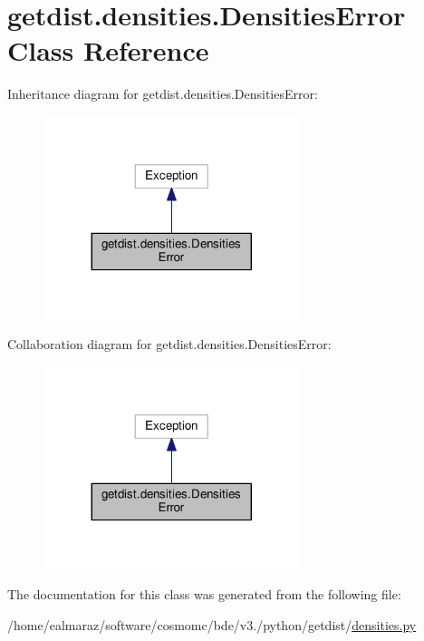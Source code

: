 \hypertarget{classgetdist_1_1densities_1_1DensitiesError}{}\section{getdist.\+densities.\+Densities\+Error Class Reference}
\label{classgetdist_1_1densities_1_1DensitiesError}


Inheritance diagram for getdist.\+densities.\+Densities\+Error\+:
\nopagebreak
\begin{figure}[H]
\begin{center}
\leavevmode
\includegraphics[width=212pt]{classgetdist_1_1densities_1_1DensitiesError__inherit__graph}
\end{center}
\end{figure}


Collaboration diagram for getdist.\+densities.\+Densities\+Error\+:
\nopagebreak
\begin{figure}[H]
\begin{center}
\leavevmode
\includegraphics[width=212pt]{classgetdist_1_1densities_1_1DensitiesError__coll__graph}
\end{center}
\end{figure}


The documentation for this class was generated from the following file\+:\begin{DoxyCompactItemize}
\item 
/home/ealmaraz/software/cosmomc/bde/v3./python/getdist/\mbox{\hyperlink{densities_8py}{densities.\+py}}\end{DoxyCompactItemize}
